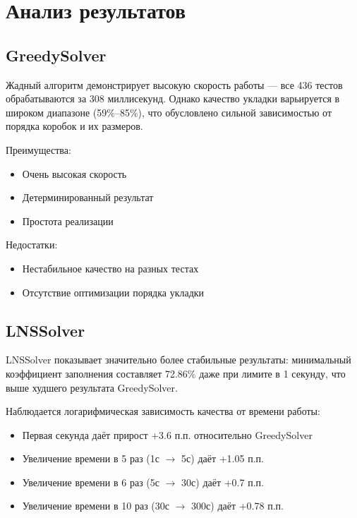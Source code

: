 \section{Анализ результатов}

\subsection{GreedySolver}

Жадный алгоритм демонстрирует высокую скорость работы — все 436 тестов обрабатываются за 308 миллисекунд. Однако качество укладки варьируется в широком диапазоне (59\%--85\%), что обусловлено сильной зависимостью от порядка коробок и их размеров.

Преимущества:
\begin{itemize}
    \item Очень высокая скорость
    \item Детерминированный результат
    \item Простота реализации
\end{itemize}

Недостатки:
\begin{itemize}
    \item Нестабильное качество на разных тестах
    \item Отсутствие оптимизации порядка укладки
\end{itemize}

\subsection{LNSSolver}

LNSSolver показывает значительно более стабильные результаты: минимальный коэффициент заполнения составляет 72.86\% даже при лимите в 1 секунду, что выше худшего результата GreedySolver.

Наблюдается логарифмическая зависимость качества от времени работы:
\begin{itemize}
    \item Первая секунда даёт прирост +3.6 п.п. относительно GreedySolver
    \item Увеличение времени в 5 раз (1с $\rightarrow$ 5с) даёт +1.05 п.п.
    \item Увеличение времени в 6 раз (5с $\rightarrow$ 30с) даёт +0.7 п.п.
    \item Увеличение времени в 10 раз (30с $\rightarrow$ 300с) даёт +0.78 п.п.
\end{itemize}

